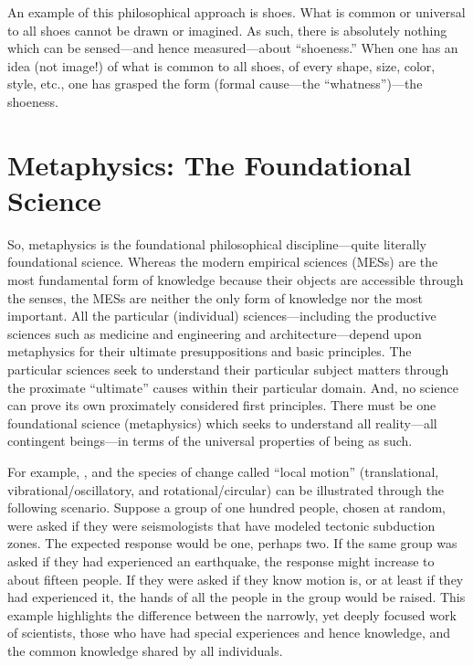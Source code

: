 An example of this philosophical approach is shoes. What is common or universal to all shoes cannot be drawn or imagined. As such, there is absolutely nothing which can be sensed---and hence measured---about ``shoeness.'' When one has an idea (not image!) of what is common to all shoes, of every shape, size, color, style, etc., one has grasped  the form (formal cause---the ``whatness'')---the shoeness.

\section{Metaphysics: The Foundational Science}\label{sec:metaphysics}

So, metaphysics is the foundational philosophical discipline---quite literally  foundational science. Whereas the modern empirical sciences (MESs) are the most fundamental form of knowledge because their objects are accessible through the senses, the MESs are neither the only form of knowledge nor the most important. All the particular (individual) sciences---including the productive sciences such as medicine and engineering and architecture---depend upon metaphysics for their ultimate presuppositions and basic principles. The particular sciences seek to understand their particular subject matters through the proximate ``ultimate'' causes within their particular domain. And, no science can prove its own proximately considered first principles. There must be one foundational science (metaphysics) which seeks to understand all reality---all contingent beings---in terms of the universal properties of being as such.

For example, , and the species of change called ``local motion'' (translational, vibrational/oscillatory, and rotational/circular) can be illustrated through the following scenario. Suppose a group of one hundred people, chosen at random, were asked if they were seismologists that have modeled tectonic subduction zones. The expected response would be one, perhaps two. If the same group was asked if they had experienced an earthquake, the response might increase to about fifteen people. If they were asked if they know  motion is, or at least if they had experienced it, the hands of all the people in the group would be raised. This example highlights the difference between the narrowly, yet deeply focused work of scientists, those who have had special experiences and hence knowledge, and the common knowledge shared by all individuals.


